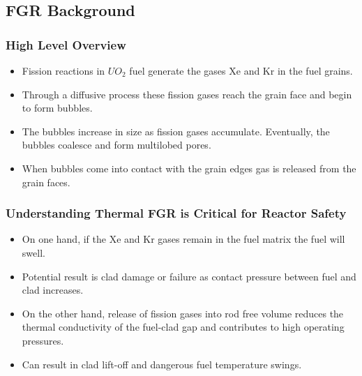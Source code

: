 \subsection{FGR Background}
\begin{frame}
\frametitle{High Level Overview}

\begin{itemize}
  \item Fission reactions in $UO_2$ fuel generate the gases Xe and Kr in the fuel grains.
  \item Through a diffusive process these fission gases reach the grain face and begin to form bubbles.
  \item The bubbles increase in size as fission gases accumulate. Eventually, the bubbles coalesce and form multilobed pores.
  \item When bubbles come into contact with the grain edges gas is released from the grain faces.
\end{itemize}

\end{frame}
\begin{frame}
\frametitle{Understanding Thermal FGR is Critical for Reactor Safety}

\begin{itemize}
  \item On one hand, if the Xe and Kr gases remain in the fuel matrix the fuel will swell.
  \item Potential result is clad damage or failure as contact pressure between fuel and clad increases.
  \item On the other hand, release of fission gases into rod free volume reduces the thermal conductivity of the fuel-clad gap and contributes to high operating pressures.
  \item Can result in clad lift-off and dangerous fuel temperature swings. 
\end{itemize}

\end{frame}

